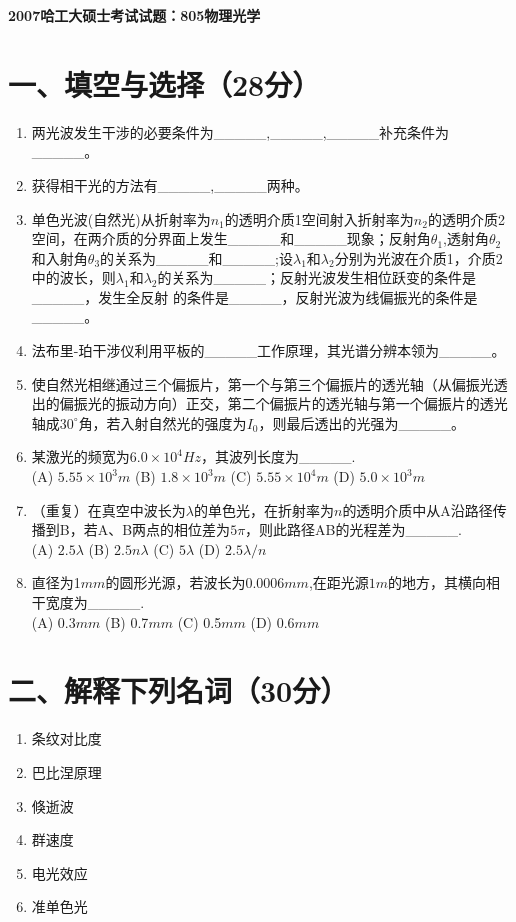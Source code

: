 \documentclass[12pt, a4paper]{article}
\theoremstyle{solution}
\begin{document}
\begin{center}
\Large\textbf{2007哈工大硕士考试试题：805物理光学}
\end{center}




\section*{一、填空与选择（28分）}
\begin{enumerate}
    \item 两光波发生干涉的必要条件为\_\_\_\_\_,\_\_\_\_\_,\_\_\_\_\_补充条件为\_\_\_\_\_。
    \item 获得相干光的方法有\_\_\_\_\_,\_\_\_\_\_两种。
    \item 单色光波(自然光)从折射率为$n_1$的透明介质1空间射入折射率为$n_2$的透明介质2空间，在两介质的分界面上发生\_\_\_\_\_和\_\_\_\_\_现象；反射角$\theta_1$,透射角$\theta_2$和入射角$\theta_3$的关系为\_\_\_\_\_和\_\_\_\_\_;设$\lambda_1$和$\lambda_2$分别为光波在介质1，介质2中的波长，则$\lambda_1$和$\lambda_2$的关系为\_\_\_\_\_；反射光波发生相位跃变的条件是\_\_\_\_\_，发生全反射
的条件是\_\_\_\_\_，反射光波为线偏振光的条件是\_\_\_\_\_。
    \item 法布里-珀干涉仪利用平板的\_\_\_\_\_工作原理，其光谱分辨本领为\_\_\_\_\_。
    \item 使自然光相继通过三个偏振片，第一个与第三个偏振片的透光轴（从偏振光透出的偏振光的振动方向）正交，第二个偏振片的透光轴与第一个偏振片的透光轴成$30^\circ$角，若入射自然光的强度为$I_0$，则最后透出的光强为\_\_\_\_\_。
    \item 某激光的频宽为$6.0\times10^{4}Hz$，其波列长度为\_\_\_\_\_.\\(A) $5.55\times10^{3}m$ \quad (B) $1.8\times10^{3}m$ \quad (C) $5.55\times10^{4}m$ \quad (D) $5.0\times10^{3}m$
    \item （重复）在真空中波长为$\lambda$的单色光，在折射率为$n$的透明介质中从A沿路径传播到B，若A、B两点的相位差为$5\pi$，则此路径AB的光程差为\_\_\_\_\_.\\(A) $2.5\lambda$ \qquad(B) $2.5n\lambda$ \qquad(C) $5\lambda$ \qquad(D) $2.5\lambda/n$
    \item 直径为1$mm$的圆形光源，若波长为0.0006$mm$,在距光源$1m$的地方，其横向相干宽度为\_\_\_\_\_.\\(A) 0.3$mm$ \qquad(B) 0.7$mm$ \qquad(C) 0.5$mm$ \qquad(D) 0.6$mm$
\end{enumerate}
\section*{二、解释下列名词（30分）}
\begin{enumerate}
    \item 条纹对比度
    \item 巴比涅原理
    \item 倏逝波
    \item 群速度
    \item 电光效应
    \item 准单色光
\end{enumerate}
\end{document}
